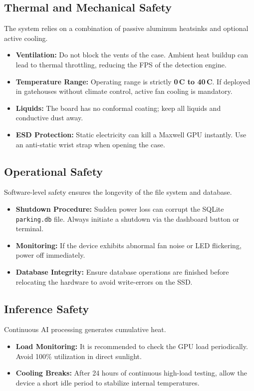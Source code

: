 \subsection{Thermal and Mechanical Safety}
The system relies on a combination of passive aluminum heatsinks and optional active cooling.
\begin{itemize}
	\item \textbf{Ventilation:} Do not block the vents of the case. Ambient heat buildup can lead to thermal throttling, reducing the FPS of the detection engine.
	\item \textbf{Temperature Range:} Operating range is strictly \textbf{0\,\textdegree C to 40\,\textdegree C}. If deployed in gatehouses without climate control, active fan cooling is mandatory.
	\item \textbf{Liquids:} The board has no conformal coating; keep all liquids and conductive dust away.
	\item \textbf{ESD Protection:} Static electricity can kill a Maxwell GPU instantly. Use an anti-static wrist strap when opening the case.
\end{itemize}

\subsection{Operational Safety}
Software-level safety ensures the longevity of the file system and database.
\begin{itemize}
	\item \textbf{Shutdown Procedure:} Sudden power loss can corrupt the SQLite \texttt{parking.db} file. Always initiate a shutdown via the dashboard button or terminal.
	\item \textbf{Monitoring:} If the device exhibits abnormal fan noise or LED flickering, power off immediately.
	\item \textbf{Database Integrity:} Ensure database operations are finished before relocating the hardware to avoid write-errors on the SSD.
\end{itemize}

\subsection{Inference Safety}
Continuous AI processing generates cumulative heat. 
\begin{itemize}
	\item \textbf{Load Monitoring:} It is recommended to check the GPU load periodically. Avoid 100\% utilization in direct sunlight.
	\item \textbf{Cooling Breaks:} After 24 hours of continuous high-load testing, allow the device a short idle period to stabilize internal temperatures.
\end{itemize}